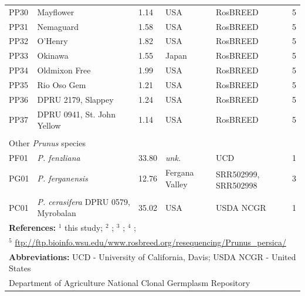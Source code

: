 \documentclass[12pt]{article}
\begin{document}
\begin{center}
\begin{longtable}{lllllc}
	PP30 &Mayflower &1.14 &USA &RosBREED &5\\
	PP31 &Nemaguard &1.58 &USA &RosBREED &5\\
	PP32 &O'Henry &1.82 &USA &RosBREED &5\\
	PP33 &Okinawa &1.55 &Japan &RosBREED &5\\
	PP34 &Oldmixon Free &1.99 &USA &RosBREED &5\\
	PP35 &Rio Oso Gem &1.21 &USA &RosBREED &5\\
	PP36 &DPRU 2179, Slappey &1.24 &USA &RosBREED &5\\
	PP37 &DPRU 0941, St. John Yellow &1.14 &USA &RosBREED &5\\
	\\
	\multicolumn{6}{l}{Other \emph{Prunus} species}  \\
	PF01 &\emph{P. fenzliana} &33.80 &\emph{unk.} &UCD &1\\
	PG01 &\emph{P. ferganensis} &12.76 &Fergana Valley &
	\multirow{2}{1cm}{SRR502999, SRR502998} &3\\
	\\
	PC01 &\emph{P. cerasifera} DPRU 0579, Myrobalan &35.02 &USA &USDA NCGR &1\\ \hline \hline
	\multicolumn{6}{l}{\textbf{References:} $^{1}$ this study; $^{2}$ \citealp{koepke2013comparative}; $^{3}$ \citealp{verde2013high}; $^{4}$ \citealp{ahmad2011whole};}\\
	\multicolumn{6}{l}{$^{5}$ \url{ftp://ftp.bioinfo.wsu.edu/www.rosbreed.org/resequencing/Prunus_persica/}}\\
	\multicolumn{6}{l}{\textbf{Abbreviations:} UCD - University of California, Davis; USDA NCGR - United States}\\
	\multicolumn{6}{l}{Department of Agriculture National Clonal Germplasm Repository}
\end{longtable}
\end{center}
\end{document}
